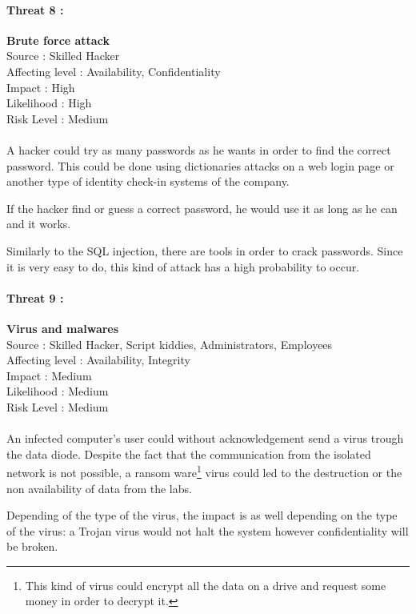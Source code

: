 \documentclass[a4paper,10pt]{article}
\begin{document}
\paragraph{Threat 8 :}  \textbf{Brute force attack} \\ 
Source : Skilled Hacker \\ 
Affecting level : Availability, Confidentiality \\
Impact : High \\
Likelihood : High \\
Risk Level : Medium
\paragraph{}A hacker could try as many passwords as he wants in order to find the correct password. This could be done using dictionaries attacks on a web login page or another type of identity check-in systems of the company.

If the hacker find or guess a correct password, he would use it as long as he can and it works.

Similarly to the SQL injection, there are tools in order to crack passwords. Since it is very easy to do, this kind of attack has a high probability to occur. \\

\paragraph{Threat 9 :}  \textbf{Virus and malwares} \\ 
Source : Skilled Hacker, Script kiddies, Administrators, Employees  \\ 
Affecting level : Availability, Integrity \\
Impact : Medium \\
Likelihood : Medium \\
Risk Level : Medium
\paragraph{}An infected computer's user could without acknowledgement send a virus trough the data diode. Despite the fact that the communication from the isolated network is not possible, a ransom ware\footnote{This kind of virus could encrypt all the data on a drive and request some money in order to decrypt it.} virus could led to the destruction or the non availability of data from the labs.

Depending of the type of the virus, the impact is as well depending on the type of the virus: a Trojan virus would not halt the system however confidentiality will be broken. 
\end{document}
